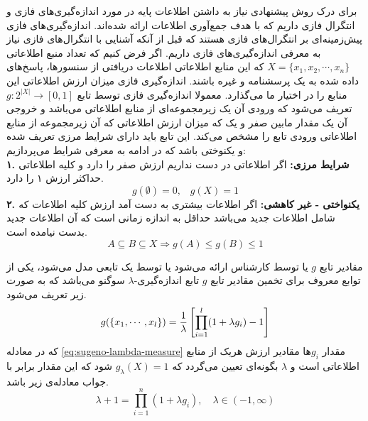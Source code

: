 \label{SEC:FI_PREVIEW}
برای درک روش پیشنهادی نیاز به داشتن اطلاعات پایه در مورد اندازه‌گیری‌های فازی و انتگرال فازی داریم که با هدف جمع‌آوری اطلاعات ارائه شده‌اند. اندازه‌گیری‌های فازی پیش‌زمینه‌ای بر انتگرال‌های فازی هستند که قبل از آنکه آشنایی با انتگرال‌های فازی نیاز به معرفی اندازه‌گیری‌های فازی داریم. اگر فرض کنیم که تعداد منبع اطلاعاتی
$X = \{x_1, x_2, \cdots, x_n\}$
که این منابع اطلاعاتی اطلاعات دریافتی از سنسورها، پاسخ‌های داده شده به یک پرسشنامه و غیره باشند. اندازه‌گیری فازی میزان ارزش اطلاعاتی این منابع را در اختیار ما می‌گذارد. معمولا اندازه‌گیری فازی توسط تابع
$g : 2^{|X|} \rightarrow [0, 1]$
تعریف می‌شود که ورودی آن یک زیرمجموعه‌ای از منابع اطلاعاتی می‌باشد و خروجی آن یک مقدار مابین صفر و یک که میزان ارزش اطلاعاتی که آن زیرمجموعه از منابع اطلاعاتی ورودی تابع را مشخص می‌کند.
این تابع باید دارای شرایط مرزی تعریف شده و یکنوختی باشد که در ادامه به معرفی شرایط می‌پردازیم:\\
\textbf{۱. شرایط مرزی:}
اگر اطلاعاتی در دست نداریم ارزش صفر را دارد و کلیه اطلاعاتی حداکثر ارزش ۱ را دارد.
\begin{equation}
g(\emptyset) = 0,\hspace{10pt} g(X) = 1
\end{equation}
\textbf{۲. یکنواختی - غیر کاهشی:}
اگر اطلاعات بیشتری به دست آمد ارزش کلیه اطلاعات که شامل اطلاعات جدید می‌باشد حداقل به اندازه زمانی است که آن اطلاعات جدید بدست نیامده است.
\begin{equation}
A \subseteq B \subseteq X \Rightarrow g(A) \leq g(B) \leq 1
\end{equation}

مقادیر تابع $g$ یا توسط کارشناس ارائه می‌شود یا توسط یک تابعی مدل می‌شود، یکی از توابع معروف برای تخمین مقادیر تابع $g$ تابع اندازه‌گیری-$\lambda$ سوگنو می‌باشد که به صورت زیر تعریف می‌شود.
\begin{equation}\label{eq:sugeno-lambda-measure}
g(\{x_1,\cdots,x_l\}) = {1 \over \lambda}\left[\prod_{i=1}^l(1 + \lambda g_i) - 1\right]
\end{equation}
که در معادله \ref{eq:sugeno-lambda-measure} مقدار $g_i$ها مقادیر ارزش هریک از منابع اطلاعاتی است و $\lambda$ بگونه‌ای تعیین می‌گردد که $g_\lambda(X) = 1$ شود که این مقدار برابر با جواب معادله‌ی زیر باشد.
\begin{equation}
\lambda + 1 = \prod_{i=1}^{n} (1 + \lambda g_i), \hspace{1em} \lambda \in (-1, \infty) 
\end{equation}

